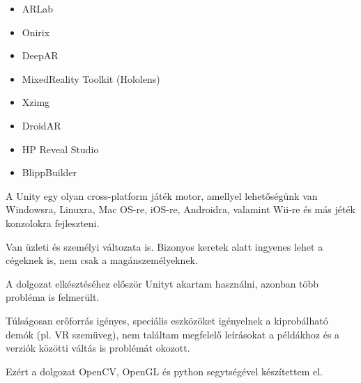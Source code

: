 
\begin{itemize}
\item ARLab
\item Onirix
\item DeepAR
\item MixedReality Toolkit (Hololens)
\item Xzimg
\item DroidAR
\item HP Reveal Studio
\item BlippBuilder
\end{itemize}


A Unity egy  olyan cross-platform játék motor, amellyel lehetőségünk van Windowsra, Linuxra, Mac OS-re, iOS-re, Androidra, valamint Wii-re és más jéték konzolokra fejleszteni.

Van üzleti és személyi változata is. Bizonyos keretek alatt ingyenes lehet a cégeknek is, nem csak a magánszemélyeknek.

A dolgozat elkésztéséhez először Unityt akartam használni, azonban több probléma is felmerült. 

Túlságosan erőforrás igényes, speciális eszközöket igényelnek a kiprobálható demók (pl. VR szemüveg), nem találtam megfelelő leírásokat a példákhoz és a verziók közötti váltás is problémát okozott.

Ezért a dolgozat OpenCV, OpenGL és python segytségével készítettem el.
